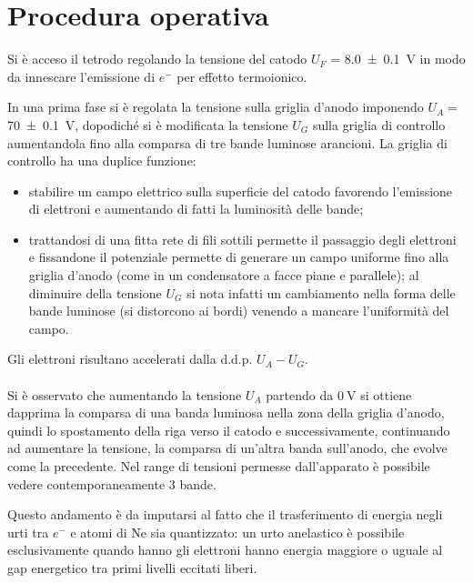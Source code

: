 \section{Procedura operativa}

	Si è acceso il tetrodo regolando la tensione del catodo $U_F$ = \SI{8.0 \pm 0.1}{\volt}
	in modo da innescare l'emissione di $e^{-}$ per effetto termoionico.
	
	In una prima fase si è regolata la tensione sulla griglia d'anodo imponendo $U_A=$ \SI{70 \pm 0.1}{\volt},	dopodiché si è modificata la tensione $U_G$ sulla griglia di controllo aumentandola fino alla comparsa di tre bande luminose arancioni.
	La griglia di controllo ha una duplice funzione: 
	\begin{itemize}
	\item  stabilire un campo elettrico sulla superficie del catodo favorendo l'emissione di elettroni e aumentando di fatti la luminosità delle bande;
	\item trattandosi di una fitta rete di fili sottili permette il passaggio degli elettroni e fissandone il potenziale permette di generare un campo uniforme fino alla griglia d'anodo (come in un condensatore a facce piane e parallele); al diminuire della tensione $U_G$ si nota infatti un cambiamento nella forma delle bande luminose (si distorcono ai bordi) venendo a mancare l'uniformità del campo.
	\end{itemize}
	
	Gli elettroni risultano accelerati dalla d.d.p. $U_A-U_G$.

\paragraph{}	
	Si è osservato che aumentando la tensione $U_A$ partendo da $\SI{0}{\volt}$ si ottiene
	dapprima la comparsa di una banda luminosa nella zona della griglia d'anodo, quindi lo spostamento della riga verso il catodo e successivamente, continuando ad aumentare  la tensione, la comparsa di un'altra banda sull'anodo, che evolve come la precedente.
	 Nel range di tensioni permesse dall'apparato è possibile vedere contemporaneamente 3 bande.
	 
		Questo andamento è da imputarsi al fatto che il trasferimento 
		di energia negli urti tra $e^{-}$ e atomi di Ne sia 
		quantizzato: un urto anelastico è possibile esclusivamente quando hanno gli elettroni hanno energia maggiore o uguale
		al gap energetico tra primi livelli eccitati liberi.
		
